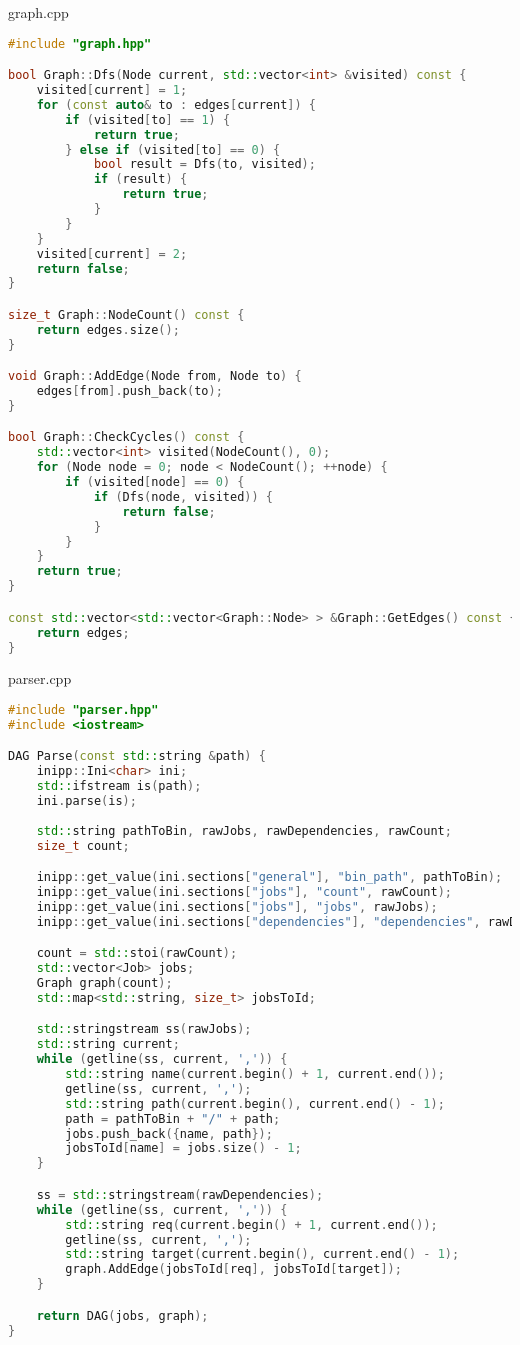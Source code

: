 \documentclass[a4paper, 12pt]{article}
\begin{document}
graph.cpp
\begin{lstlisting}[language=C++]
#include "graph.hpp"

bool Graph::Dfs(Node current, std::vector<int> &visited) const {
    visited[current] = 1;
    for (const auto& to : edges[current]) {
        if (visited[to] == 1) {
            return true;
        } else if (visited[to] == 0) {
            bool result = Dfs(to, visited);
            if (result) {
                return true;
            }
        }
    }
    visited[current] = 2;
    return false;
}

size_t Graph::NodeCount() const {
    return edges.size();
}

void Graph::AddEdge(Node from, Node to) {
    edges[from].push_back(to);
}

bool Graph::CheckCycles() const {
    std::vector<int> visited(NodeCount(), 0);
    for (Node node = 0; node < NodeCount(); ++node) {
        if (visited[node] == 0) {
            if (Dfs(node, visited)) {
                return false;
            }
        }
    }
    return true;
}

const std::vector<std::vector<Graph::Node> > &Graph::GetEdges() const {
    return edges;
}
\end{lstlisting}

parser.cpp
\begin{lstlisting}[language=C++]
#include "parser.hpp"
#include <iostream>

DAG Parse(const std::string &path) {
    inipp::Ini<char> ini;
    std::ifstream is(path);
    ini.parse(is);
    
    std::string pathToBin, rawJobs, rawDependencies, rawCount;
    size_t count;

    inipp::get_value(ini.sections["general"], "bin_path", pathToBin);
    inipp::get_value(ini.sections["jobs"], "count", rawCount);
    inipp::get_value(ini.sections["jobs"], "jobs", rawJobs);
    inipp::get_value(ini.sections["dependencies"], "dependencies", rawDependencies);

    count = std::stoi(rawCount);
    std::vector<Job> jobs;
    Graph graph(count);
    std::map<std::string, size_t> jobsToId;

    std::stringstream ss(rawJobs);
    std::string current;
    while (getline(ss, current, ',')) {
        std::string name(current.begin() + 1, current.end());
        getline(ss, current, ',');
        std::string path(current.begin(), current.end() - 1);
        path = pathToBin + "/" + path;
        jobs.push_back({name, path});
        jobsToId[name] = jobs.size() - 1;
    }

    ss = std::stringstream(rawDependencies);
    while (getline(ss, current, ',')) {
        std::string req(current.begin() + 1, current.end());
        getline(ss, current, ',');
        std::string target(current.begin(), current.end() - 1);
        graph.AddEdge(jobsToId[req], jobsToId[target]);
    }

    return DAG(jobs, graph);
}
\end{lstlisting}
\end{document}
